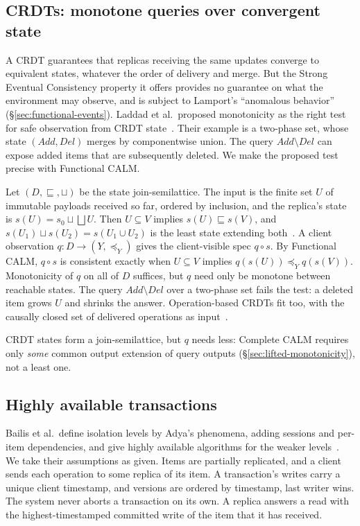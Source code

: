 \documentclass[sigconf]{cidr-2027}
\theoremstyle{remark}
\newcommand{\outrelpart}{extending\xspace}    %
\newcommand{\outnoun}{output extension\xspace}%
\begin{document}
\subsection{CRDTs: monotone queries over convergent state}
\label{sec:crdt-instance}

A CRDT guarantees that replicas receiving the same updates converge to
equivalent states, whatever the order of delivery and merge.  But the Strong
Eventual Consistency property it offers provides no guarantee on what the
environment may observe, and is subject to Lamport's ``anomalous
behavior''~\cite{lamport1978time} (\S\ref{sec:functional-events}). Laddad et al.\
proposed monotonicity as the right test for safe observation from CRDT
state~\cite{laddad2022keep}.  Their example is a two-phase set, whose state
$(\mathit{Add},\mathit{Del})$ merges by componentwise union.  The query
$\mathit{Add}\setminus\mathit{Del}$ can expose added items that are subsequently
deleted.  We make the proposed test precise with Functional CALM.

Let $(D,\sqsubseteq,\sqcup)$ be the state join-semilattice.  The input is the
finite set $U$ of immutable payloads received so far, ordered by inclusion, and
the replica's state is $s(U)=s_0\sqcup\bigsqcup U$.  Then $U\subseteq V$
implies $s(U)\sqsubseteq s(V)$, and $s(U_1)\sqcup s(U_2)=s(U_1\cup U_2)$ is the
least state \outrelpart both~\cite{shapiro2011crdt}.  A client observation
$q:D\to(Y,\preceq_Y)$ gives the client-visible spec $q\circ s$.  By
Functional CALM, $q\circ s$ is consistent exactly when $U\subseteq V$ implies
$q(s(U))\preceq_Y q(s(V))$.  Monotonicity of $q$ on all of $D$ suffices, but
$q$ need only be monotone between reachable states.  The query $\mathit{Add}\setminus\mathit{Del}$ over a two-phase set fails the test: a deleted item grows $U$ and shrinks the answer.
Operation-based CRDTs fit too, with the causally closed set of
delivered operations as
input~\cite{shapiro2011crdt,burckhardt2014replicated,baquero2014operation,hellerstein2025turtles}.

CRDT states form a join-semilattice, but $q$ needs less:
Complete CALM requires only \emph{some} common \outnoun of query outputs
(\S\ref{sec:lifted-monotonicity}), not a least one.

\subsection{Highly available transactions}
\label{sec:hat-instance}

Bailis et al.\ define isolation levels by Adya's phenomena, adding sessions and
per-item dependencies, and give highly available algorithms for the weaker
levels~\cite{bailis2013hat,adya1999weakconsistency}.  We take their
assumptions as given.  Items are partially replicated, and a client sends each
operation to some replica of its item.  A transaction's writes carry a unique
client timestamp, and versions are ordered by timestamp, last writer wins.
The system never aborts a transaction on its own.  A replica answers a read
with the highest-timestamped committed write of the item that it has received.
\end{document}
